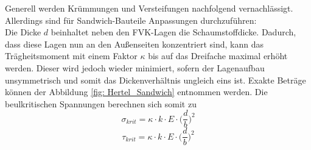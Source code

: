\noindent Generell werden Krümmungen und Versteifungen nachfolgend vernachlässigt. Allerdings sind für Sandwich-Bauteile Anpassungen durchzuführen:\\
Die Dicke $d$ beinhaltet neben den FVK-Lagen die Schaumstoffdicke. Dadurch, dass diese Lagen nun an den Außenseiten konzentriert sind, kann das Trägheitsmoment mit einem Faktor $\kappa$ bis auf das Dreifache maximal erhöht werden. Dieser wird jedoch wieder minimiert, sofern der Lagenaufbau unsymmetrisch und somit das Dickenverhältnis ungleich eins ist. Exakte Beträge können der Abbildung \ref{fig: Hertel_Sandwich} entnommen werden. Die beulkritischen Spannungen berechnen sich somit zu
\begin{equation}
	\sigma_{krit}=\kappa\cdot k\cdot E\cdot\Big(\frac{d}{b}\Big)^{2}
\end{equation}
\begin{equation}
	\tau_{krit}=\kappa\cdot k\cdot E\cdot\Big(\frac{d}{b}\Big)^{2}
\end{equation}

